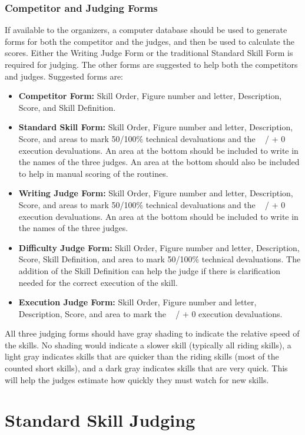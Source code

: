 \subsection{Competitor and Judging Forms}
If available to the organizers, a computer database should be used to generate forms for both the competitor and the judges, and then be used to calculate the scores.
Either the Writing Judge Form or the traditional Standard Skill Form is required for judging.
The other forms are suggested to help both the competitors and judges.
Suggested forms are: 
\begin{itemize}
\item \textbf{Competitor Form:} Skill Order, Figure number and letter, Description, Score, and Skill Definition.
\item \textbf{Standard Skill Form:} Skill Order, Figure number and letter, Description, Score, and areas to mark 50/100\% technical devaluations and the ~ / + 0 execution devaluations.
An area at the bottom should be included to write in the names of the three judges.
An area at the bottom should also be included to help in manual scoring of the routines.
\item \textbf{Writing Judge Form:} Skill Order, Figure number and letter, Description, Score, and areas to mark 50/100\% technical devaluations and the ~ / + 0 execution devaluations.
An area at the bottom should be included to write in the names of the three judges.
\item \textbf{Difficulty Judge Form:} Skill Order, Figure number and letter, Description, Score, Skill Definition, and area to mark 50/100\% technical devaluations.
The addition of the Skill Definition can help the judge if there is clarification needed for the correct execution of the skill.
\item \textbf{Execution Judge Form:} Skill Order, Figure number and letter, Description, Score, and area to mark the ~ / + 0 execution devaluations.
\end{itemize}

All three judging forms should have gray shading to indicate the relative speed of the skills.
No shading would indicate a slower skill (typically all riding skills), a light gray indicates skills that are quicker than the riding skills (most of the counted short skills), and a dark gray indicates skills that are very quick.
This will help the judges estimate how quickly they must watch for new skills.

\chapter{Standard Skill Judging}

